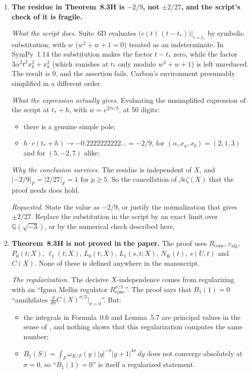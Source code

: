 \documentclass[12pt,letterpaper]{article}
\begin{document}
\begin{enumerate}[leftmargin=1.5em]
\item \textbf{The residue in Theorem~8.3H is $-2/9$, not $\pm2/27$, and the
script's check of it is fragile.}

\emph{What the script does.} Suite~6D evaluates
$\bigl(c(t)\,(t-t_*)\bigr)\big|_{t=t_*}$ by symbolic substitution, with
$w$ ($w^2+w+1=0$) treated as an indeterminate. In SymPy~1.14 the substitution
makes the factor $t-t_*$ zero, while the factor $3\alpha^2t^2x_b^2+x_a^2$
(which vanishes at $t_*$ only modulo $w^2+w+1$) is left unreduced. The result
is $0$, and the assertion fails. Carbon's environment presumably simplified in
a different order.

\emph{What the expression actually gives.} Evaluating the unsimplified
expression of the script at $t_*+h$, with $w=e^{2\pi i/3}$, at 50 digits:
\begin{itemize}[leftmargin=1.5em]
\item there is a genuine simple pole;
\item $h\cdot c(t_*+h)\to-0.2222222222\ldots=-2/9$, for
$(\alpha,x_a,x_b)=(2,1,3)$ and for $(5,-2,7)$ alike;
\end{itemize}

\emph{Why the conclusion survives.} The residue is independent of $X$, and
$|{-2/9}|_F=|2/27|_F=1$ for $p\ge5$. So the cancellation of
$\beta\epsilon\zeta(X)$ that the proof needs does hold.

\emph{Requested.} State the value as $-2/9$, or justify the normalization
that gives $\pm2/27$. Replace the substitution in the script by an exact
limit over $\mathbb Q(\sqrt{-3})$, or by the numerical check described here.

\item \textbf{Theorem~8.3H is not proved in the paper.} The proof uses
$R_{\mathrm{cone}}$, $c_{\mathrm{alg}}$, $P_0(t;X)$, $\ell_1(t;X)$,
$L_0(t;X)$, $L_1(s,t;X)$, $N_K(t)$, $s(U,t)$ and $C(X)$. None of these is
defined anywhere in the manuscript.

\emph{The regularization.} The decisive $X$-independence comes from
regularizing with an ``Igusa Mellin regulator $R_{\mathrm{cone}}^{\sigma/3}$''.
The proof says that $B_1(1)=0$ ``annihilates
$\frac{d}{d\sigma}C(X)^{\sigma/3}|_{\sigma=0}$''. But:
\begin{itemize}[leftmargin=1.5em]
\item the integrals in Formula~0.6 and Lemma~5.7 are principal values in the
sense of \cite{LS83}, and nothing shows that this regularization computes the
same number;
\item $B_1(S)=\int_F\omega_{K/F}(y)|y|^{-\sigma}|y+1|^{4\sigma}\,dy$ does not
converge absolutely at $\sigma=0$, so ``$B_1(1)=0$'' is itself a regularized
statement.
\end{itemize}


\end{enumerate}
\end{document}
